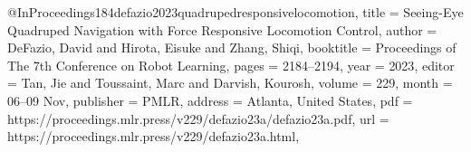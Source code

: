 @InProceedings{184defazio2023quadrupedresponsivelocomotion,
title = 	 {Seeing-Eye Quadruped Navigation with Force Responsive Locomotion Control},
author =       {DeFazio, David and Hirota, Eisuke and Zhang, Shiqi},
booktitle = 	 {Proceedings of The 7th Conference on Robot Learning},
pages = 	 {2184--2194},
year = 	 {2023},
editor = 	 {Tan, Jie and Toussaint, Marc and Darvish, Kourosh},
volume = 	 {229},
month = 	 {06--09 Nov},
publisher =    {PMLR},
address = {Atlanta, United States},
pdf = 	 {https://proceedings.mlr.press/v229/defazio23a/defazio23a.pdf},
url = 	 {https://proceedings.mlr.press/v229/defazio23a.html},
}